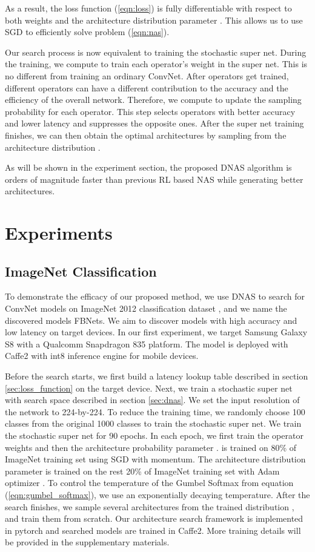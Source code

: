 \documentclass[10pt,twocolumn,letterpaper]{article}
\begin{document}
As a result, the loss function (\ref{eqn:loss}) is fully differentiable with respect to both weights  and the architecture distribution parameter . This allows us to use SGD to efficiently solve problem (\ref{eqn:nas}). 

Our search process is now equivalent to training the stochastic super net. During the training, we compute  to train each operator's weight in the super net. This is no different from training an ordinary ConvNet. After operators get trained, different operators can have a different contribution to the accuracy and the efficiency of the overall network. Therefore, we compute  to update the sampling probability  for each operator. This step selects operators with better accuracy and lower latency and suppresses the opposite ones. After the super net training finishes, we can then obtain the optimal architectures by sampling from the architecture distribution . 

As will be shown in the experiment section, the proposed DNAS algorithm is orders of magnitude faster than previous RL based NAS while generating better architectures. 

\section{Experiments}
\subsection{ImageNet Classification}
To demonstrate the efficacy of our proposed method, we use DNAS to search for ConvNet models on ImageNet 2012 classification dataset \cite{deng2009imagenet}, and we name the discovered models FBNets. We aim to discover models with high accuracy and low latency on target devices. In our first experiment, we target Samsung Galaxy S8 with a Qualcomm Snapdragon 835 platform. The model is deployed with Caffe2 with int8 inference engine for mobile devices.

Before the search starts, we first build a latency lookup table described in section \ref{sec:loss_function} on the target device. Next, we train a stochastic super net with search space described in section \ref{sec:dnas}. We set the input resolution of the network to 224-by-224. To reduce the training time, we randomly choose 100 classes from the original 1000 classes to train the stochastic super net. We train the stochastic super net for 90 epochs. In each epoch, we first train the operator weights  and then the architecture probability parameter .  is trained on 80\% of ImageNet training set using SGD with momentum. 
The architecture distribution parameter  is trained on the rest 20\% of ImageNet training set with Adam optimizer \cite{kingma2014adam}.
To control the temperature of the Gumbel Softmax from equation (\ref{eqn:gumbel_softmax}), we use an exponentially decaying temperature. After the search finishes, we sample several architectures from the trained distribution , and train them from scratch. Our architecture search framework is implemented in pytorch \cite{paszke2017automatic} and searched models are trained in Caffe2. More training details will be provided in the supplementary materials. 
\end{document}
